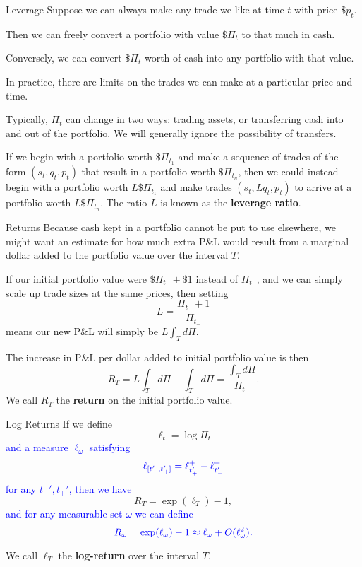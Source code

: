 \documentclass{beamer}
\begin{document}
\begin{frame}{Leverage}
	Suppose we can always make any trade we like at time $t$ with price $\$p_t$.

	Then we can freely convert a portfolio with value $\$\Pi_t$ to that much in cash.

	Conversely, we can convert $\$\Pi_t$ worth of cash into any portfolio with that value.

	In practice, there are limits on the trades we can make at a particular price and time.

	\pause

	Typically, $\Pi_t$ can change in two ways: trading assets, or transferring cash into and out of the portfolio. We will generally ignore the possibility of transfers.

	\pause

	If we begin with a portfolio worth $\$\Pi_{t_1}$ and make a sequence of trades of the form $(s_t,q_t,p_t)$ that result in a portfolio worth $\$\Pi_{t_n}$, then we could instead begin with a portfolio worth $L \$\Pi_{t_1}$ and make trades $(s_t, L q_t, p_t)$ to arrive at a portfolio worth $L \$\Pi_{t_n}$. The ratio $L$ is known as the \textbf{leverage ratio}.
\end{frame}

\begin{frame}{Returns}
	Because cash kept in a portfolio cannot be put to use elsewhere, we might want an estimate for how much extra P\&L would result from a marginal dollar added to the portfolio value over the interval $T$.

	If our initial portfolio value were $\$\Pi_{t_-}+\$1$ instead of $\Pi_{t_-}$, and we can simply scale up trade sizes at the same prices, then setting
	$$L = \frac{\Pi_{t_-}+1}{\Pi_{t_-}}$$
	means our new P\&L will simply be $L \int_T d\Pi$.

	The increase in P\&L per dollar added to initial portfolio value is then
	$$R_T = L \int_T d\Pi - \int_T d\Pi = \frac{\int_T d\Pi}{\Pi_{t_-}}.$$
	We call $R_T$ the \textbf{return} on the initial portfolio value.
\end{frame}

\begin{frame}{Log Returns}
	If we define
	$$\ell_t = \log \Pi_t$$ %
	\textcolor{blue}{and a measure $\ell_\omega$ satisfying}
	$$\textcolor{blue}{\ell_{[t_-',t_+']}= \ell_{t_+'}^+ - \ell_{t_-'}^-}$$
	\textcolor{blue}{for any $t_-',t_+'$, then we have}
	$$R_T = \exp(\ell_T) - 1,$$
	\textcolor{blue}{and for any measurable set $\omega$ we can define}
	$$\textcolor{blue}{R_\omega = \exp(\ell_\omega) - 1 \approx \ell_\omega + O(\ell_\omega^2).}$$

	We call $\ell_T$ the \textbf{log-return} over the interval $T$.
\end{frame}
\end{document}
